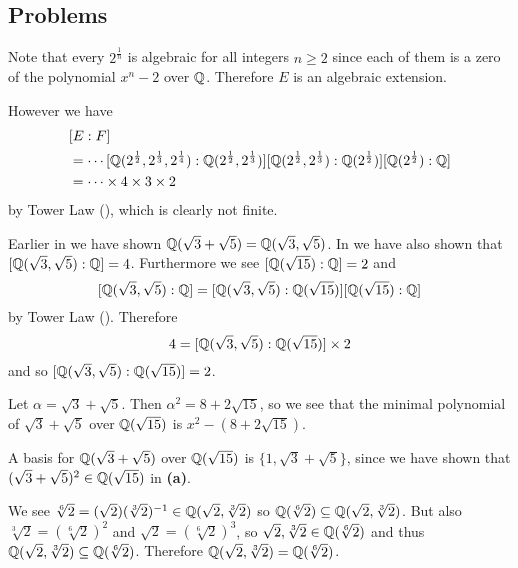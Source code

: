 \subsection*{Problems}
\begin{questions}
    \item Note that every $2^{\frac1n}$ is algebraic for all integers $n \geq 2$ since each of them is a zero of the polynomial $x^n - 2$ over $\mathbb{Q}$. Therefore $E$ is an algebraic extension.

    However we have
    \begin{align*}
        &[E: F]\\
        &= \cdots[\mathbb{Q}(2^{\frac12},2^{\frac13},2^{\frac14}):\mathbb{Q}(2^{\frac12},2^{\frac13})]
        [\mathbb{Q}(2^{\frac12},2^{\frac13}):\mathbb{Q}(2^{\frac12})][\mathbb{Q}(2^{\frac12}):\mathbb{Q}]\\
        &= \cdots \times 4 \times 3 \times 2
    \end{align*}
    by Tower Law (), which is clearly not finite.

    \item Earlier in  we have shown $\mathbb{Q}(\sqrt3 + \sqrt5) = \mathbb{Q}(\sqrt3,\sqrt5)$. In  we have also shown that $[\mathbb{Q}(\sqrt3,\sqrt5):\mathbb{Q}] = 4$. Furthermore we see $[\mathbb{Q}(\sqrt{15}):\mathbb{Q}] = 2$ and
    \[
        [\mathbb{Q}(\sqrt3,\sqrt5):\mathbb{Q}] = [\mathbb{Q}(\sqrt3,\sqrt5):\mathbb{Q}(\sqrt{15})][\mathbb{Q}(\sqrt{15}):\mathbb{Q}]
    \]
    by Tower Law (). Therefore
    \[
        4 = [\mathbb{Q}(\sqrt3,\sqrt5):\mathbb{Q}(\sqrt{15})]\times2
    \]
    and so $[\mathbb{Q}(\sqrt3,\sqrt5):\mathbb{Q}(\sqrt{15})] = 2$.

    \begin{partquestions}{\alph*}
        \item Let $\alpha = \sqrt3 + \sqrt5$. Then $\alpha^2 = 8 + 2\sqrt{15}$, so we see that the minimal polynomial of $\sqrt3+\sqrt5$ over $\mathbb{Q}(\sqrt{15})$ is $x^2 - (8 + 2\sqrt{15})$.

        \item A basis for $\mathbb{Q}(\sqrt3 + \sqrt5)$ over $\mathbb{Q}(\sqrt{15})$ is $\{1, \sqrt3 + \sqrt5\}$, since we have shown that $(\sqrt3 + \sqrt5)^2 \in \mathbb{Q}(\sqrt{15})$ in \textbf{(a)}.
    \end{partquestions}

    \item We see $\sqrt[6]2 = (\sqrt2)(\sqrt[3]2)^{-1} \in \mathbb{Q}(\sqrt2, \sqrt[3]2)$ so $\mathbb{Q}(\sqrt[6]2) \subseteq \mathbb{Q}(\sqrt2,\sqrt[3]2)$. But also $\sqrt[3]2 = \left(\sqrt[6]2\right)^2$ and $\sqrt2 = \left(\sqrt[6]2\right)^3$, so $\sqrt2,\sqrt[3]2 \in \mathbb{Q}(\sqrt[6]2)$ and thus $\mathbb{Q}(\sqrt2,\sqrt[3]2) \subseteq \mathbb{Q}(\sqrt[6]2)$. Therefore $\mathbb{Q}(\sqrt2,\sqrt[3]2) = \mathbb{Q}(\sqrt[6]2)$.


\end{questions}
